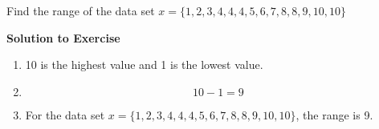 \begin{description}[noitemsep]
\begin{description}[noitemsep]
{\begin{mdframed}[linewidth=4, leftmargin=40, rightmargin=40]
\begin{exercise}
          \label{m39400*probfhsst!!!underscore!!!id1581}
          \label{m39400*id212761}Find the range of the data set $x=\{1,2,3,4,4,4,5,6,7,8,8,9,10,10\}$ \par 
          \vspace{5pt}
          \label{m39400*solfhsst!!!underscore!!!id1584}\noindent\textbf{Solution to Exercise } \label{m39400*listfhsst!!!underscore!!!id1584}\begin{enumerate}[noitemsep, label=\textbf{Step} \textbf{\arabic*}. ] 
            \leftskip=20pt\rightskip=\leftskip\item  
          \label{m39400*id212859}10 is the highest value and 1 is the lowest value.\par 
          \item  
          \label{m39400*id212868}\nopagebreak\noindent{}
            
    \begin{equation}
    10-1=9\tag{16.5}
      \end{equation}
          \item  
          \label{m39400*id212892}For the data set $x=\{1,2,3,4,4,4,5,6,7,8,8,9,10,10\}$, the range is 9. \par 
          \end{enumerate}
    \end{exercise}
    \end{mdframed}
    }
    \noindent
        \label{m39400*uid75}

\end{description}
\end{description}
